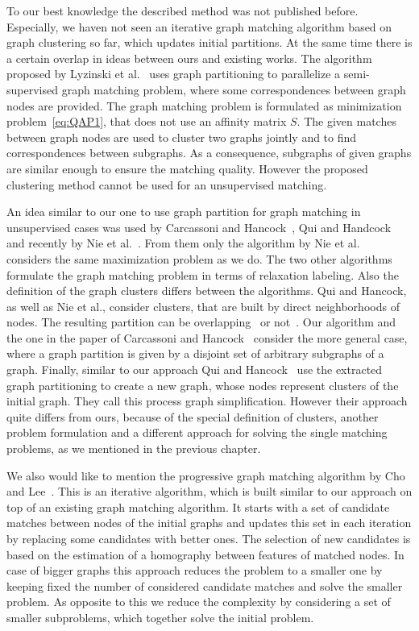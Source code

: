 To our best knowledge the described method was not published before. Especially, we haven not seen an iterative graph matching algorithm based on graph clustering so far, which updates initial partitions. At the same time there is a certain overlap in ideas between ours and existing works. The algorithm proposed by Lyzinski et al.~\cite{Lyzinski2015} uses graph partitioning to parallelize a semi-supervised graph matching problem, where some correspondences between graph nodes are provided. The graph matching problem is formulated as minimization problem~\eqref{eq:QAP1}, that does not use an affinity matrix $S$. The given matches between graph nodes are used to cluster two graphs jointly and to find correspondences between subgraphs. As a consequence, subgraphs of given graphs are similar enough to ensure the matching quality. However the proposed clustering method cannot be used for an unsupervised matching.

An idea similar to our one to use graph partition for graph matching in unsupervised cases was used by Carcassoni and Hancock~\cite{Hancock_ModalClusters}, Qui and Handcock~\cite{Hancock_GM_SpectralPart} and recently by Nie et al.~\cite{CliqueGraph_CVPR2015}. From them only the algorithm by Nie et al.~\cite{CliqueGraph_CVPR2015} considers the same maximization problem as we do. The two other algorithms formulate the graph matching problem in terms of relaxation labeling. Also the definition of the graph clusters differs between the algorithms. Qui and Hancock, as well as Nie et al., consider clusters, that are built by direct neighborhoods of nodes. The resulting partition can be overlapping~\cite{CliqueGraph_CVPR2015} or not~\cite{Hancock_GM_SpectralPart}. Our algorithm and the one in the paper of Carcassoni and Hancock~\cite{Hancock_ModalClusters} consider the more general case, where a graph partition is given by a disjoint set of arbitrary subgraphs of a graph.
Finally, similar to our approach Qui and Hancock~\cite{Hancock_GM_SpectralPart} use the extracted graph partitioning to create a new graph, whose nodes represent clusters of the initial graph. They call this process graph simplification. However their approach quite differs from ours, because of the special definition of clusters, another problem formulation and a different approach for solving the single matching problems, as we mentioned in the previous chapter.

We also would like to mention the progressive graph matching algorithm by Cho and Lee~\cite{Cho2012_ProgressiveGM}. This is an iterative algorithm, which is built similar to our approach on top of an existing graph matching algorithm. It starts with a set of candidate matches between nodes of the initial graphs and updates this set in each iteration by replacing some candidates with better ones. The selection of new candidates is based on the estimation of a homography between features of matched nodes. In case of bigger graphs this approach reduces the problem to a smaller one by keeping fixed the number of considered candidate matches and solve the smaller problem. As opposite to this we reduce the complexity by considering a set of smaller subproblems, which together solve the initial problem.


